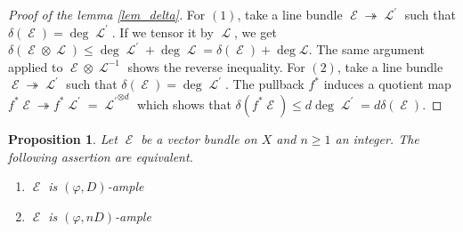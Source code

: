 \documentclass[11pt]{amsart}
\numberwithin{subsection}{section}
\numberwithin{figure}{section}
\numberwithin{table}{section}
\theoremstyle{1}
\newtheorem{proposition}[theorem]{Proposition}
\theoremstyle{2}
\DeclareMathOperator{\Lc}{\mathcal{L}}
\DeclareMathOperator{\E}{\mathcal{E}}
\begin{document}
\begin{proof}[Proof of the lemma \ref{lem_delta}]
For $(1)$, take a line bundle $\E \twoheadrightarrow \Lc^{\prime}$ such that $\delta(\E) = \deg \Lc^\prime$. If we tensor it by $\Lc$, we get $\delta(\E \otimes \Lc) \leq \deg \Lc^\prime + \deg \Lc =  \delta(\E) + \deg \mathcal{L}$. The same argument applied to $\E \otimes \Lc^{-1}$ shows the reverse inequality. For $(2)$, take a line bundle $\E \twoheadrightarrow \Lc^{\prime}$ such that $\delta(\E) = \deg \Lc^\prime$. The pullback $f^*$ induces a quotient map $f^*\E \twoheadrightarrow f^*\Lc^{\prime} = {\Lc^{\prime}}^{\otimes d}$ which shows that $\delta(f^*\E) \leq d\deg\Lc^{\prime} = d\delta(\E)$.
\end{proof}
\begin{proposition}\label{nD}
Let $\E$ be a vector bundle on $X$ and $n\geq 1$ an integer. The following assertion are equivalent.
\begin{enumerate}
\item $\E$ is $(\varphi,D)$-ample
\item $\E$ is $(\varphi,nD)$-ample
\end{enumerate}
\end{proposition}
\end{document}
